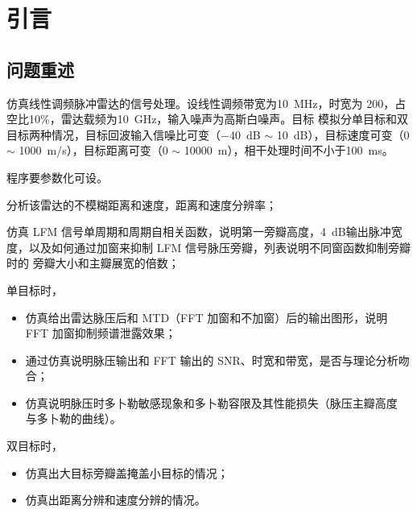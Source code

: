 \documentclass[../main]{subfiles}
\begin{document}
\chapter{引言}%
\label{cha:introduction}

\section{问题重述}%
\label{sec:problem}

仿真线性调频脉冲雷达的信号处理。设线性调频带宽为\SI{10}{\MHz}，时宽为
\SI{200}{}，占空比10\%，雷达载频为\SI{10}{GHz}，输入噪声为高斯白噪声。目标
模拟分单目标和双目标两种情况，目标回波输入信噪比可变（\SI{-40}{dB} $\sim$
\SI{10}{dB}），目标速度可变（0 $\sim$ \SI{1000}{m/s}），目标距离可变（0
$\sim$ \SI{10000}{m}），相干处理时间不小于\SI{100}{ms}。

程序要参数化可设。

\begin{Exercise}[label = ex:1]
  分析该雷达的不模糊距离和速度，距离和速度分辨率；
\end{Exercise}

\begin{Exercise}[label = ex:2]
  仿真 LFM 信号单周期和周期自相关函数，说明第一旁瓣高度，\SI{4}{dB}输出脉冲宽
  度，以及如何通过加窗来抑制 LFM 信号脉压旁瓣，列表说明不同窗函数抑制旁瓣时的
  旁瓣大小和主瓣展宽的倍数；
\end{Exercise}

\begin{Exercise}[label = ex:3]
  单目标时，
  \begin{itemize}
    \item 仿真给出雷达脉压后和 MTD（FFT 加窗和不加窗）后的输出图形，说明 FFT
      加窗抑制频谱泄露效果；
    \item 通过仿真说明脉压输出和 FFT 输出的 SNR、时宽和带宽，是否与理论分析吻
      合；
    \item 仿真说明脉压时多卜勒敏感现象和多卜勒容限及其性能损失（脉压主瓣高度
      与多卜勒的曲线）。
  \end{itemize}
\end{Exercise}

\begin{Exercise}[label = ex:4]
  双目标时，
  \begin{itemize}
    \item 仿真出大目标旁瓣盖掩盖小目标的情况；
    \item 仿真出距离分辨和速度分辨的情况。
  \end{itemize}
\end{Exercise}
\end{document}

